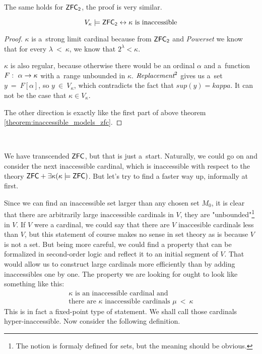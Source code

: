 The same holds for $\sf{ZFC}_2$, the proof is very similar.
\begin{theorem}\label{theorem:inaccessible_models_zfc_2}
\begin{equation}
V_\kappa \models \sf{ZFC}_2 \iff \mbox{$\kappa$ is inaccessible}
\end{equation}
\end{theorem}
\begin{proof}
$\kappa$ is a~strong limit cardinal because from $\sf{ZFC}_2$ and \emph{Powerset} we know that for every $\lambda\ <\ \kappa$, we know that $2^{\lambda} < \kappa$.

$\kappa$ is also regular, because otherwise there would be an ordinal $\alpha$ and a~function $F:\ \alpha \then \kappa$ with a~range unbounded in $\kappa$. 
$\emph{Replacement}^2$ gives us a~set $y\ =\ F[\alpha]$, so $y\ \in\ V_\kappa$, which contradicts the fact that $sup(y) = kappa$. It can not be the case that $\kappa \in V_\kappa$.
\

The other direction is exactly like the first part of above theorem \ref{theorem:inaccessible_models_zfc}.
\end{proof}

\



We have transcended $\sf{ZFC}$, but that is just a~start. Naturally, we could go on and consider the next inaccessible cardinal, which is inaccessible with respect to the theory $\sf{ZFC} + \exists \kappa (\kappa \models \sf{ZFC})$. But let's try to find a faster way up, informally at first. 

Since we can find an inaccessible set larger than any chosen set $M_0$, it is clear that there are arbitrarily large inaccessible cardinals in $V$, they are "unbounded"\footnote{The notion is formaly defined for sets, but the meaning should be obvious.} in $V$. If $V$ were a cardinal, we could say that there are $V$ inaccesible cardinals less than $V$, but this statement of course makes no sense in set theory as is because $V$ is not a set. But being more careful, we could find a property that can be formalized in second-order logic and reflect it to an initial segment of $V$. That would allow us to construct large cardinals more efficiently than by adding inaccessibles one by one. The property we are looking for ought to look like something like this:
\begin{equation}
\begin{gathered}
\kappa \mbox{ is an inaccessible cardinal and}\\
\mbox{there are }\kappa\mbox{ inaccessible cardinals }\mu\ <\ \kappa
\end{gathered}
\end{equation}
This is in fact a fixed-point type of statement. We shall call those cardinals hyper-inaccessible. Now consider the following definition.

